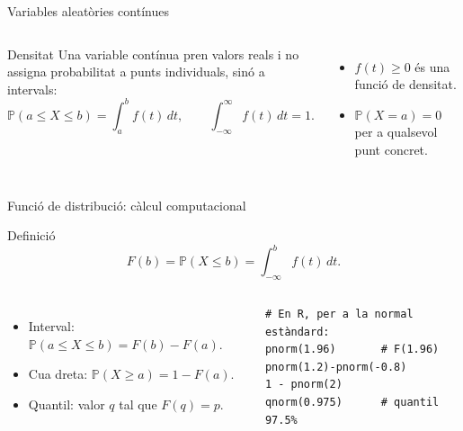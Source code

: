 \documentclass[10pt,aspectratio=169]{beamer}
\newcommand{\Prob}{\mathbb{P}}
\begin{document}
\begin{frame}[fragile]{Variables aleatòries contínues}
\begin{columns}[T]
\begin{block}{Densitat}
Una variable contínua pren valors reals i no assigna probabilitat a punts individuals, sinó a intervals:
\[
\Prob(a\le X\le b)=\int_a^b f(t)\,dt,
\qquad \int_{-\infty}^{\infty} f(t)\,dt=1.
\]
\end{block}
\begin{itemize}
  \item $f(t)\ge 0$ és una funció de densitat.
  \item $\Prob(X=a)=0$ per a qualsevol punt concret.
\end{itemize}
\end{columns}
\end{frame}

\begin{frame}[fragile]{Funció de distribució: càlcul computacional}
\begin{block}{Definició}
\[
F(b)=\Prob(X\le b)=\int_{-\infty}^{b} f(t)\,dt.
\]
\end{block}
\begin{columns}[T]
\begin{itemize}
  \item Interval: $\Prob(a\le X\le b)=F(b)-F(a)$.
  \item Cua dreta: $\Prob(X\ge a)=1-F(a)$.
  \item Quantil: valor $q$ tal que $F(q)=p$.
\end{itemize}
\begin{lstlisting}
# En R, per a la normal estàndard:
pnorm(1.96)       # F(1.96)
pnorm(1.2)-pnorm(-0.8)
1 - pnorm(2)
qnorm(0.975)      # quantil 97.5%
\end{lstlisting}
\end{columns}
\end{frame}
\end{document}
